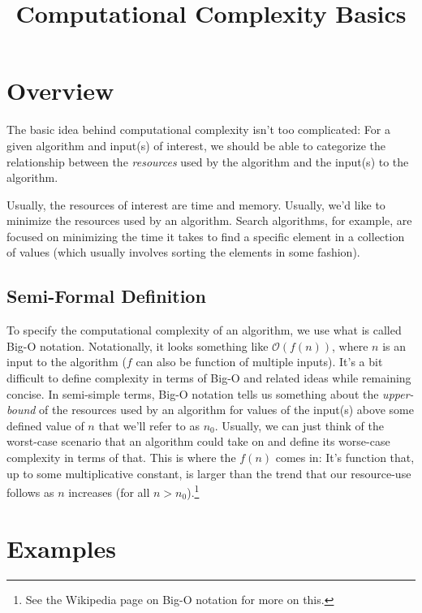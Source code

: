 \documentclass[11pt]{article}
\title{Computational Complexity Basics}
\author{}
\date{\vspace{-7ex}}
\begin{document}
\maketitle

\section{Overview}
The basic idea behind computational complexity isn't too complicated: For a
given algorithm and input(s) of interest, we should be able to categorize the
relationship between the \textit{resources} used by the algorithm and the
input(s) to the algorithm.

Usually, the resources of interest are time and memory. Usually, we'd like to
minimize the resources used by an algorithm. Search algorithms, for example,
are focused on minimizing the time it takes to find a specific element in a
collection of values (which usually involves sorting the elements in some
fashion).

\subsection{Semi-Formal Definition} \label{sec:def}
To specify the computational complexity of an algorithm, we use what is called
Big-O notation. Notationally, it looks something like $\mathcal{O}(f(n))$, where
$n$ is an input to the algorithm ($f$ can also be function of multiple inputs).
It's a bit difficult to define complexity in terms of Big-O and related ideas
while remaining concise. In semi-simple terms, Big-O notation tells us something
about the \textit{upper-bound} of the resources used by an algorithm for
values of the input(s) above some defined value of $n$ that we'll refer to
as $n_0$. Usually, we can just think of the worst-case scenario that an
algorithm could take on and define its worse-case complexity in terms of
that. This is where the $f(n)$ comes in: It's function that, up to some
multiplicative constant, is larger than the trend that our resource-use
follows as $n$ increases (for all $n > n_0$).\footnote{See the Wikipedia page on
Big-O notation for more on this.}

\section{Examples}
\end{document}
